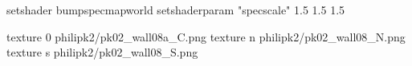 setshader bumpspecmapworld
setshaderparam "specscale" 1.5 1.5 1.5

texture 0 philipk2/pk02_wall08a_C.png
texture n philipk2/pk02_wall08_N.png
texture s philipk2/pk02_wall08_S.png

